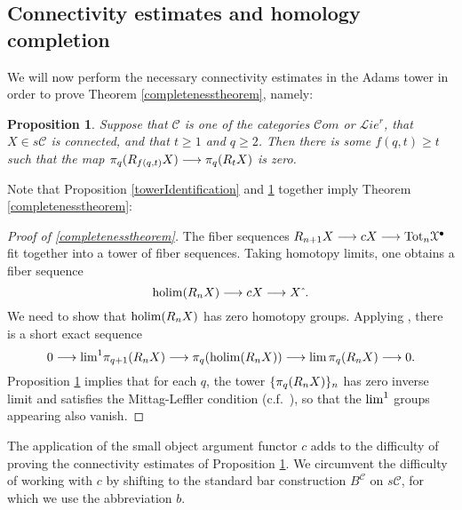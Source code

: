 \documentclass[11pt]{amsart} \renewcommand{\baselinestretch}{1.4}
\theoremstyle{plain}
\newtheorem{prop}[thm]{Proposition}
\theoremstyle{definition}
\DeclareMathOperator*{\holim}{holim}
\renewcommand{\to}{\longrightarrow}
\newcommand{\scrL}{\mathscr{L}}
\newcommand{\scrC}{\mathscr{C}}
\newcommand{\calx}{\mathcal{X}}
\newcommand{\calc}{\mathcal{C}}
\newcommand{\citeBOX}[2][]{\cite[\mbox{#1}]{#2}}
\newcommand{\algs}{{\scrC\!\textit{om}}}
\newcommand{\restliealgs}{{\scrL\!\textit{ie}^\textit{r}}}
\newcommand{\algcat}{{\calc}}%
\newcommand{\dupdown}[2]{R_{\smash{#1}}}
\newcommand{\algCat}{\calc}
\newcommand{\barConstructionMightAbbreviate}{b}
\begin{document}
\begin{Bousfield-Kan spectral sequence}
\subsection{Connectivity estimates and homology completion}
\label{sec:connectivityAnalysis}
We will now perform the necessary connectivity estimates in the Adams tower in order to prove Theorem \ref{completenesstheorem}, namely:  
%
\begin{prop}
\label{convergenceProp}
Suppose that $\algcat$ is one of the categories $\algs$ or $\restliealgs$, that $X\in s\algcat$ is connected, and that  $t\geq1$ and $q\geq2$. Then there is some $f(q,t)\geq t$ such that the map $\pi_q(\dupdown{f(q,t)}{c}X)\to\pi_q(\dupdown{t}{c}X)$ is zero.
\end{prop}
\noindent Note that Proposition \ref{towerIdentification} and \ref{convergenceProp} together imply Theorem \ref{completenesstheorem}:
\begin{proof}[Proof of \ref{completenesstheorem}]
The fiber sequences $\dupdown{n+1}{c}X\to cX\to \textup{Tot}_n\calx^\bullet$ fit together into a tower of fiber sequences. Taking homotopy limits, one obtains a fiber sequence
\[\holim (\dupdown{n}{c}X)\to cX\to X\hat{\ }.\]
We need to show that $\holim (\dupdown{n}{c}X)$ has zero homotopy groups.
Applying \cite[Proposition 6.14]{goerss-jardine.pdf}, there is a short exact sequence
\[0\to \textup{lim}^1\pi_{q+1}(\dupdown{n}{c}X)\to \pi_q(\holim (\dupdown{n}{c}X))\to \textup{lim}\,\pi_{q}(\dupdown{n}{c}X)\to 0.\]
Proposition \ref{convergenceProp} implies that for each $q$, the tower $\{\pi_{q}(\dupdown{n}{c}X)\}_n$ has zero inverse limit and satisfies the Mittag-Leffler condition (c.f.\ \citeBOX[p.~264]{YellowMonster}), so that the $\textup{lim}^1$ groups appearing also vanish.
\end{proof}
The application of the small object argument functor $c$ adds to the difficulty of proving the connectivity estimates of Proposition \ref{convergenceProp}. We circumvent the difficulty of working with $c$ by shifting to the standard bar construction $B^{\algCat}$ on $s\algCat$, for which we use the abbreviation $\barConstructionMightAbbreviate $.


\end{Bousfield-Kan spectral sequence}
\end{document}
